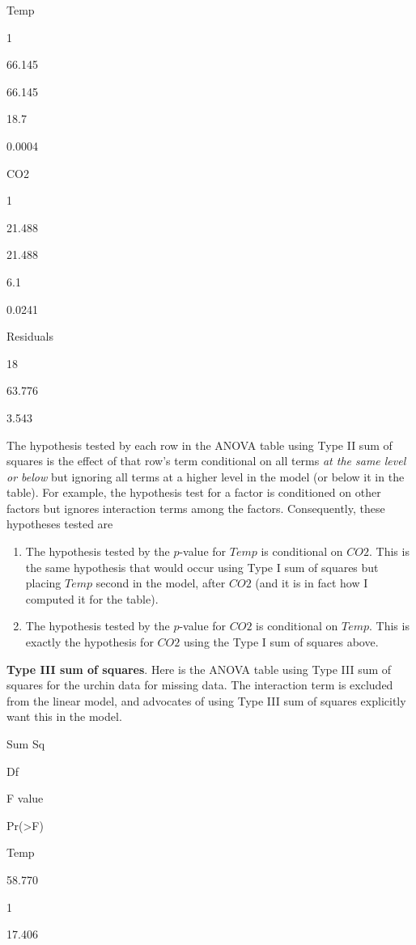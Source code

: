 \documentclass[]{book}
\begin{document}
Temp

1

66.145

66.145

18.7

0.0004

CO2

1

21.488

21.488

6.1

0.0241

Residuals

18

63.776

3.543

The hypothesis tested by each row in the ANOVA table using Type II sum of squares is the effect of that row's term conditional on all terms \emph{at the same level or below} but ignoring all terms at a higher level in the model (or below it in the table). For example, the hypothesis test for a factor is conditioned on other factors but ignores interaction terms among the factors. Consequently, these hypotheses tested are

\begin{enumerate}
\def\labelenumi{\arabic{enumi}.}
\item
  The hypothesis tested by the \(p\)-value for \(Temp\) is conditional on \(CO2\). This is the same hypothesis that would occur using Type I sum of squares but placing \(Temp\) second in the model, after \(CO2\) (and it is in fact how I computed it for the table).
\item
  The hypothesis tested by the \(p\)-value for \(CO2\) is conditional on \(Temp\). This is exactly the hypothesis for \(CO2\) using the Type I sum of squares above.
\end{enumerate}

\textbf{Type III sum of squares}. Here is the ANOVA table using Type III sum of squares for the urchin data for missing data. The interaction term is excluded from the linear model, and advocates of using Type III sum of squares explicitly want this in the model.

Sum Sq

Df

F value

Pr(\textgreater F)

Temp

58.770

1

17.406
\end{document}
